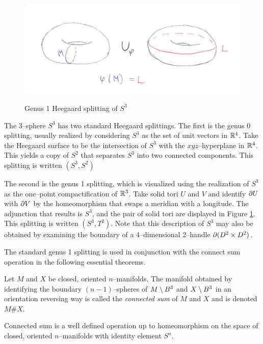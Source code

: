 \begin{figure}
		\centering
		\caption{Genus 1 Heegaard splitting of $S^3$}
		\includegraphics[width=6in]{figures/genus1split.jpg}
		\label{fig:genus1split}
\end{figure}

\begin{ex}
	The 3--sphere $S^3$ has two standard Heegaard splittings.
	The first is the genus 0 splitting, usually realized by considering $S^3$ as the set of unit vectors in $\mathbb{R}^4$.
	Take the Heegaard surface to be the intersection of $S^3$ with the $xyz$--hyperplane in $\mathbb{R}^4$.
	This yields a copy of $S^2$ that separates $S^3$ into two connected components.
	This splitting is written $(S^3,S^2)$
	
	The second is the genus 1 splitting, which is visualized using the realization of $S^3$ as the one--point compactification of $\mathbb{R}^3$.
	Take solid tori $U$ and $V$ and identify $\partial U$ with $\partial V$ by the homeomorphism that swaps a meridian with a longitude.
	The adjunction that results is $S^3$, and the pair of solid tori are displayed in Figure \ref{fig:genus1split}.
	This splitting is written $(S^3,T^2)$.
	Note that this description of $S^3$ may also be obtained by examining the boundary of a 4--dimensional 2--handle $\partial (D^2\times D^2)$.
\end{ex}

The standard genus 1 splitting is used in conjunction with the connect sum operation in the following essential theorems.

\begin{defn}
	Let $M$ and $X$ be closed, oriented $n$--manifolds.
	The manifold obtained by identifying the boundary $(n-1)$--spheres of $M\setminus B^3$ and $X\setminus B^3$ in an orientation reversing way is called the \emph{connected sum} of $M$ and $X$ and is denoted $M\# X$.
\end{defn}

\begin{theorem}
	Connected sum is a well defined operation up to homeomorphism on the space of closed, oriented $n$--manifolds with identity element $S^n$.
\end{theorem}
	
